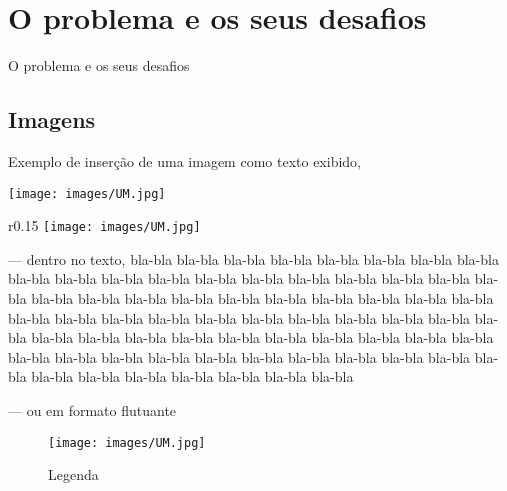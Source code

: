 \chapter{O problema e os seus desafios}

O problema e os seus desafios

\section{Imagens}
Exemplo de inserção de uma imagem como texto exibido,
\begin{center}
	\texttt{[image: images/UM.jpg]}
\end{center}

\begin{wrapfigure}{r}{0.15\textwidth}	
	\texttt{[image: images/UM.jpg]}
\end{wrapfigure}
\noindent --- dentro no texto,
bla-bla bla-bla bla-bla bla-bla bla-bla bla-bla bla-bla bla-bla bla-bla bla-bla
bla-bla bla-bla bla-bla bla-bla bla-bla bla-bla bla-bla bla-bla bla-bla bla-bla
bla-bla bla-bla bla-bla bla-bla bla-bla bla-bla bla-bla bla-bla bla-bla bla-bla
bla-bla bla-bla bla-bla bla-bla bla-bla bla-bla bla-bla bla-bla bla-bla bla-bla
bla-bla bla-bla bla-bla bla-bla bla-bla bla-bla bla-bla bla-bla bla-bla bla-bla bla-bla bla-bla bla-bla bla-bla
bla-bla bla-bla bla-bla bla-bla bla-bla bla-bla bla-bla bla-bla bla-bla bla-bla bla-bla bla-bla bla-bla bla-bla

\noindent --- ou em formato flutuante
\begin{figure}
\begin{center}
	\texttt{[image: images/UM.jpg]}
\end{center}
\caption{Legenda}
\end{figure}